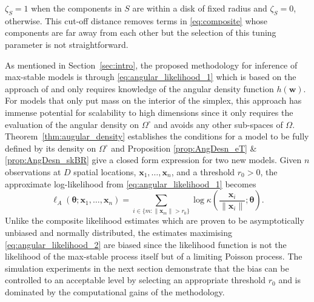 \documentclass[lineno]{biometrika}
\begin{document}
$\zeta_S=1$ when the components in $S$ are within a disk of fixed radius and $\zeta_S=0$, otherwise. This cut-off distance 
removes terms in \eqref{eq:composite} whose components are far away from each other but the selection of this tuning parameter is not straightforward. 

As mentioned in Section~\ref{sec:intro}, the proposed methodology for inference of max-stable models is through \eqref{eq:angular_likelihood_1} which is based on the approach of  \cite{Coles.Tawn:1994} and only requires knowledge of the angular density function $h(\bm w)$. For models that only put mass on the interior of the simplex, this approach has immense potential for scalability to high dimensions since it only requires the evaluation of the angular density on $\Omega^\circ$ and avoids any other sub-spaces of $\Omega$. Theorem~\ref{thm:augular_density} establishes the conditions for a model to be fully defined by its density on $\Omega^\circ$ and Proposition \ref{prop:AngDesn_eT} \& \ref{prop:AngDesn_skBR} give a closed form expression for two new models. 
Given $n$ observations at $D$ spatial locations, $\bm x_1,\dots,\bm x_n$, and a threshold $r_0>0$, the approximate log-likelihood from \eqref{eq:angular_likelihood_1} becomes
%
\begin{equation}
\label{eq:angular_likelihood_2}
\ell_A(\bm \theta;\bm x_1,\dots,\bm x_n) = 
\sum_{i \in \{m: \|\bm x_m\| > r_0\}} 
\log\kappa\left(\frac{\bm x_i}{\|\bm x_i\|};\bm \theta\right). 
\end{equation} 
%
Unlike the composite likelihood estimates which are proven to be asymptotically unbiased and normally distributed, the estimates maximising \eqref{eq:angular_likelihood_2} are biased since the likelihood function is not the likelihood of the max-stable process itself but of a limiting Poisson process. The simulation experiments in the next section demonstrate that the bias can be controlled to an acceptable level by selecting an appropriate threshold $r_0$ and is dominated by the computational gains of the methodology.
\end{document}
